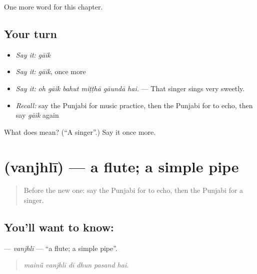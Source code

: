 \begin{grammarlens}[title={What you've built}]
One more word for this chapter.
\end{grammarlens}

\subsection*{Your turn}
\begin{itemize}
\raggedright
  \item \emph{Say it:} \emph{gāik}
  \item \emph{Say it:} \emph{gāik}, once more
  \item \emph{Say it:} \emph{oh gāik bahut miṭṭhā gāundā hai.} — That singer sings very sweetly.
  \item \emph{Recall:} say the Punjabi for music practice, then the Punjabi for to echo, then say \emph{gāik} again
\end{itemize}

\begin{tcolorbox}[breakable,colback=teal!4,colframe=teal!35!black,title={Before you move on}]
What does  mean? (\textquotedblleft{}A singer\textquotedblright{}.) Say it once more.
\end{tcolorbox}
\section[\texorpdfstring{\pa{ਵੰਝਲੀ} (vanjhlī)}{ਵੰਝਲੀ (vanjhlī)}]{ (vanjhlī) — a flute; a simple pipe}

\label{lesson:PA-C349-vanjhli}



\begin{quote}
Before the new one: say the Punjabi for to echo, then the Punjabi for a singer.
\end{quote}

\subsection*{You'll want to know: }
\textbf{} — \emph{vanjhlī} — \textquotedblleft{}a flute; a simple pipe\textquotedblright{}.

\begin{quote}
     
\end{quote}

\begin{quote}
\emph{mainū̃ vanjhlī dī dhun pasand hai.}
\end{quote}

